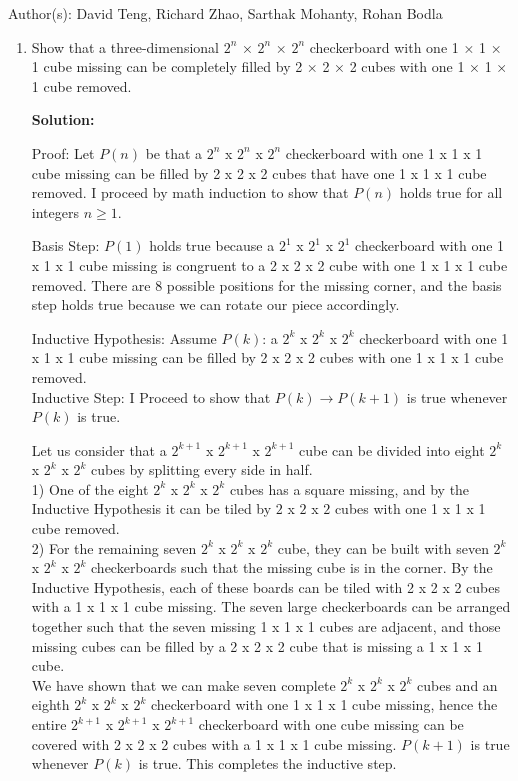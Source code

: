 \documentclass{article}
\newenvironment{solution}
{
\par
\color{blue}
\textbf{Solution:}
}
{
\par
}
\begin{document}
Author(s): David Teng, Richard Zhao, Sarthak Mohanty, Rohan Bodla
\newpage
\begin{enumerate}

\item Show that a three-dimensional $2^n$ × $2^n$ × $2^n$ checkerboard with one 1 × 1 × 1 cube missing can be completely filled by 2 × 2 × 2 cubes with one 1 × 1 × 1 cube removed.
\begin{solution}
Proof: Let $P(n)$ be that a $2^n$ x $2^n$ x $2^n$ checkerboard with one 1 x 1 x 1 cube missing can be filled by 2 x 2 x 2 cubes that have one 1 x 1 x 1 cube removed. I proceed by math induction to show that $P(n)$ holds true for all integers $n \geq 1$.

Basis Step: $P(1)$ holds true because a $2^1$ x $2^1$ x $2^1$ checkerboard with one 1 x 1 x 1 cube missing is congruent to a 2 x 2 x 2 cube with one 1 x 1 x 1 cube removed. There are 8 possible positions for the missing corner, and the basis step holds true because we can rotate our piece accordingly.

Inductive Hypothesis: Assume $P(k)$: a $2^k$ x $2^k$ x $2^k$ checkerboard with one 1 x 1 x 1 cube missing can be filled by 2 x 2 x 2 cubes with one 1 x 1 x 1 cube removed.\\
Inductive Step: I Proceed to show that $P(k) \rightarrow P(k + 1)$ is true whenever $P(k)$ is true.

Let us consider that a $2^{k+1}$ x $2^{k+1}$ x $2^{k+1}$ cube can be divided into eight $2^k$ x $2^k$ x $2^k$ cubes by splitting every side in half.\\
1) One of the eight $2^k$ x $2^k$ x $2^k$ cubes has a square missing, and by the Inductive Hypothesis it can be tiled by $2$ x $2$ x $2$ cubes with one 1 x 1 x 1 cube removed.\\
2) For the remaining seven $2^k$ x $2^k$ x $2^k$ cube, they can be built with seven $2^k$ x $2^k$ x $2^k$ checkerboards such that the missing cube is in the corner. By the Inductive Hypothesis, each of these boards can be tiled with 2 x 2 x 2 cubes with a 1 x 1 x 1 cube missing. The seven large checkerboards can be arranged together such that the seven missing 1 x 1 x 1 cubes are adjacent, and those missing cubes can be filled by a 2 x 2 x 2 cube that is missing a 1 x 1 x 1 cube.\\
We have shown that we can make seven complete $2^k$ x $2^k$ x $2^k$ cubes and an eighth $2^k$ x $2^k$ x $2^k$ checkerboard with one 1 x 1 x 1 cube missing, hence the entire $2^{k+1}$ x $2^{k+1}$ x $2^{k+1}$ checkerboard with one cube missing can be covered with 2 x 2 x 2 cubes with a 1 x 1 x 1 cube missing. $P(k+1)$ is true whenever $P(k)$ is true. This completes the inductive step.


\end{solution}
\end{enumerate}
\end{document}
